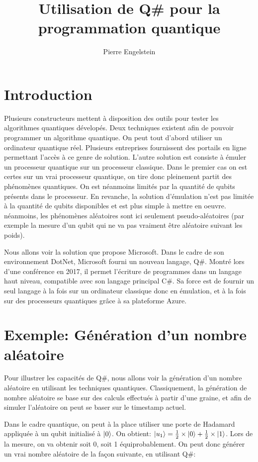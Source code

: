 \documentclass[12pt,a4paper]{article}
\title{Utilisation de Q\# pour la programmation quantique}
\author{Pierre Engelstein}
\date{}
\DeclarePairedDelimiter\ket{\lvert}{\rangle}
\begin{document}
\maketitle

\section{Introduction}
Plusieurs constructeurs mettent à disposition des outils pour tester les algorithmes quantiques dévelopés. Deux techniques existent afin de pouvoir programmer un algorithme quantique. On peut tout d'abord utiliser un ordinateur quantique réel. Plusieurs entreprises fournissent des portails en ligne permettant l'accès à ce genre de solution. L'autre solution est consiste à émuler un processeur quantique sur un processeur classique. Dans le premier cas on est certes sur un vrai processeur quantique, on tire donc pleinement partit des phénomènes quantiques. On est néanmoins limités par la quantité de qubits présents dans le processeur. En revanche, la solution d'émulation n'est pas limitée à la quantité de qubits disponibles et est plus simple à mettre en oeuvre. néanmoins, les phénomènes aléatoires sont ici seulement pseudo-aléatoires (par exemple la mesure d'un qubit qui ne va pas vraiment être aléatoire suivant les poids).

Nous allons voir la solution que propose Microsoft. Dans le cadre de son environnement DotNet, Microsoft fourni un nouveau langage, Q\#. Montré lors d'une conférence en 2017, il permet l'écriture de programmes dans un langage haut niveau, compatible avec son langage principal C\#. Sa force est de fournir un seul langage à la fois sur un ordinateur classique donc en émulation, et à la fois sur des processeurs quantiques grâce à sa plateforme Azure.

\section{Exemple: Génération d'un nombre aléatoire}
Pour illustrer les capacités de Q\#, nous allons voir la génération d'un nombre aléatoire en utilisant les techniques quantiques. Classiquement, la génération de nombre aléatoire se base sur des calculs effectués à partir d'une graine, et afin de simuler l'aléatoire on peut se baser sur le timestamp actuel.

Dans le cadre quantique, on peut à la place utiliser une porte de Hadamard appliquée à un qubit initialisé à $\ket{0}$. On obtient: $\ket{u_1} = \frac{1}{2} \times \ket{0} + \frac{1}{2} \times \ket{1}$. Lors de la mesure, on va obtenir soit 0, soit 1 équiprobablement. On peut donc générer un vrai nombre aléatoire de la façon suivante, en utilisant Q\#:
\end{document}
